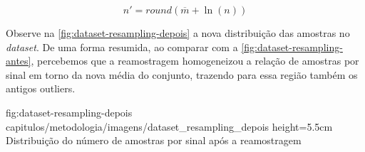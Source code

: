 \begin{equation}
    \label{eqn:resampling-target}
    n' = round( \overline{m} + \ln(n) )
\end{equation}


Observe na \autoref{fig:dataset-resampling-depois} a nova distribuição das amostras no \textit{dataset}. De uma forma resumida, ao comparar com a \autoref{fig:dataset-resampling-antes}, percebemos que a reamostragem homogeneizou a relação de amostras por sinal em torno da nova média do conjunto, trazendo para essa região também os antigos outliers.


\figura
{fig:dataset-resampling-depois} %
{capitulos/metodologia/imagens/dataset_resampling_depois} %
{height=5.5cm} %
{Distribuição do número de amostras por sinal após a reamostragem} %
{} %






